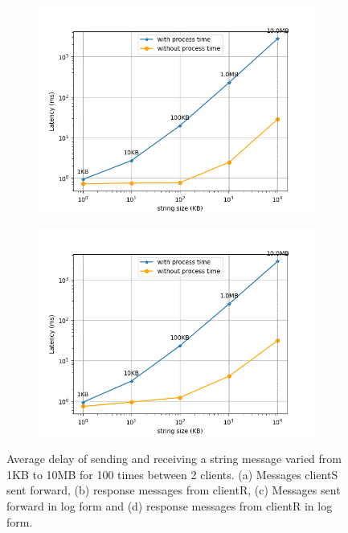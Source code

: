 \begin{figure}[htb]
\begin{subfigure}[b]{0.49\textwidth}
        \end{subfigure}
    \begin{subfigure}[b]{0.49\textwidth}
        \centering
        \includegraphics[width=\textwidth]{figures/tests/proportional_tests/log_Average_string_messages_sending_time_of_100_tests_1KB_to_10MB.png}\hfill 
        \caption{} \label{fig: proportional-stringsize-c}
    \end{subfigure}
    \begin{subfigure}[b]{0.49\textwidth}
        \centering
        \includegraphics[width=\textwidth]{figures/tests/proportional_tests/log_Average_string_messages_receiving_time_of_100_tests_1KB_to_10MB.png}\hfill 
        \caption{} \label{fig: proportional-stringsize-d}
    \end{subfigure}
    \caption{Average delay of sending and receiving a string message varied from 1KB 
    to 10MB for 100 times between 2 clients. (a) Messages clientS sent forward, 
    (b) response messages from clientR, (c) Messages sent forward in log form 
    and (d) response messages from clientR in log form. 
    \label{fig: proportional-stringsize}}
\end{figure}

